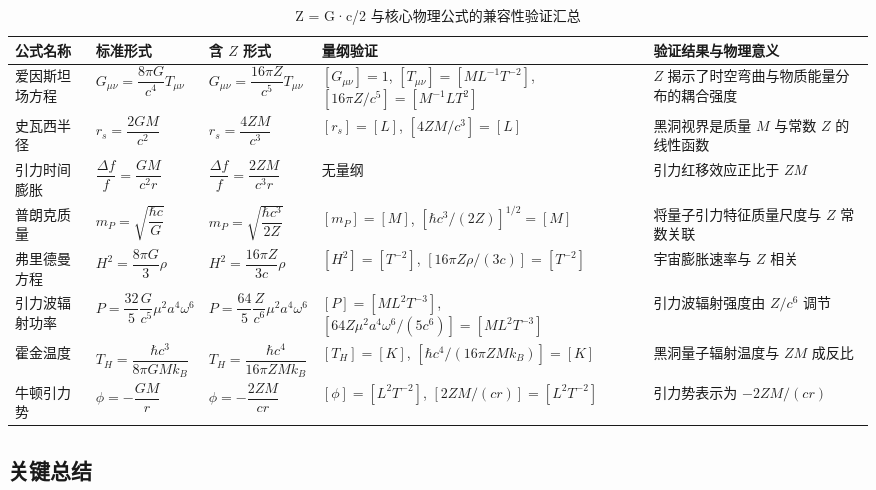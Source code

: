 \documentclass[12pt,a4paper]{article}
\begin{document}
\begin{table}[H]
\centering
\caption{Z = G·c/2 与核心物理公式的兼容性验证汇总}
\label{table:z_compatibility_verification}
\begin{tabular}{|l|l|l|l|l|}
\hline
\textbf{公式名称} & \textbf{标准形式} & \textbf{含 $Z$ 形式} & \textbf{量纲验证} & \textbf{验证结果与物理意义} \\
\hline
爱因斯坦场方程 & $G_{\mu\nu} = \dfrac{8\pi G}{c^4} T_{\mu\nu}$ & $G_{\mu\nu} = \dfrac{16\pi Z}{c^5} T_{\mu\nu}$ & $[G_{\mu\nu}] = 1$, $[T_{\mu\nu}] = [M L^{-1} T^{-2}]$, $[16\pi Z / c^5] = [M^{-1} L T^2]$ & $Z$ 揭示了时空弯曲与物质能量分布的耦合强度 \\
史瓦西半径 & $r_s = \dfrac{2 G M}{c^2}$ & $r_s = \dfrac{4 Z M}{c^3}$ & $[r_s] = [L]$, $[4 Z M / c^3] = [L]$ & 黑洞视界是质量 $M$ 与常数 $Z$ 的线性函数 \\
引力时间膨胀 & $\dfrac{\Delta f}{f} = \dfrac{G M}{c^2 r}$ & $\dfrac{\Delta f}{f} = \dfrac{2 Z M}{c^3 r}$ & 无量纲 & 引力红移效应正比于 $Z M$ \\
普朗克质量 & $m_P = \sqrt{\dfrac{\hbar c}{G}}$ & $m_P = \sqrt{\dfrac{\hbar c^3}{2 Z}}$ & $[m_P] = [M]$, $[\hbar c^3 / (2Z)]^{1/2} = [M]$ & 将量子引力特征质量尺度与 $Z$ 常数关联 \\
弗里德曼方程 & $H^2 = \dfrac{8\pi G}{3} \rho$ & $H^2 = \dfrac{16\pi Z}{3 c} \rho$ & $[H^2] = [T^{-2}]$, $[16\pi Z \rho / (3c)] = [T^{-2}]$ & 宇宙膨胀速率与 $Z$ 相关 \\
引力波辐射功率 & $P = \dfrac{32}{5} \dfrac{G}{c^5} \mu^2 a^4 \omega^6$ & $P = \dfrac{64}{5} \dfrac{Z}{c^6} \mu^2 a^4 \omega^6$ & $[P] = [M L^2 T^{-3}]$, $[64 Z \mu^2 a^4 \omega^6 / (5 c^6)] = [M L^2 T^{-3}]$ & 引力波辐射强度由 $Z/c^6$ 调节 \\
霍金温度 & $T_H = \dfrac{\hbar c^3}{8\pi G M k_B}$ & $T_H = \dfrac{\hbar c^4}{16\pi Z M k_B}$ & $[T_H] = [K]$, $[\hbar c^4 / (16\pi Z M k_B)] = [K]$ & 黑洞量子辐射温度与 $Z M$ 成反比 \\
牛顿引力势 & $\phi = -\dfrac{G M}{r}$ & $\phi = -\dfrac{2 Z M}{c r}$ & $[\phi] = [L^2 T^{-2}]$, $[2 Z M / (c r)] = [L^2 T^{-2}]$ & 引力势表示为 $-2ZM/(cr)$ \\
\hline
\end{tabular}
\end{table}

\subsection{关键总结}
\label{subsection:key_summary}
\end{document}
